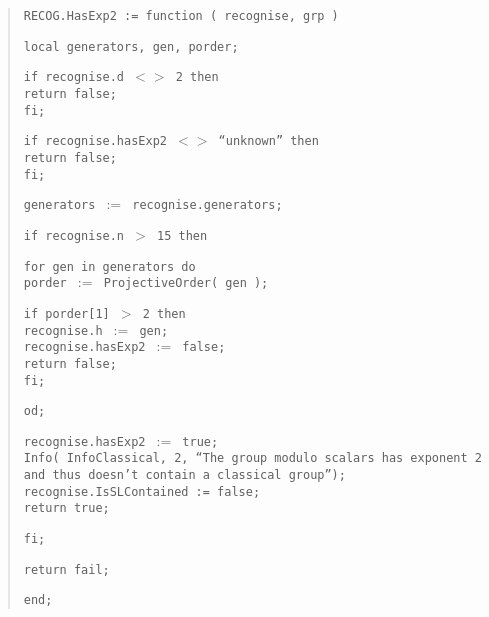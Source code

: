 \documentclass[a4paper,11pt]{article}
\theoremstyle{bla}
\begin{document}
\begin{quote}
\hspace*{-0.3cm} \texttt{RECOG.HasExp2 := function ( recognise, grp )}

  \texttt{local generators, gen, porder;}

  \texttt{if recognise.d $<>$ 2 then}\\
    \hspace*{0.3cm} \texttt{return false;}\\
  \texttt{fi;}

  \texttt{if recognise.hasExp2 $<>$ ``unknown'' then}\\
    \hspace*{0.3cm} \texttt{return false;}\\
  \texttt{fi;}

  \texttt{generators $:=$ recognise.generators;}

  \texttt{if recognise.n $>$ 15 then}

    \hspace*{0.3cm} \texttt{for gen in generators do}\\
      \hspace*{0.6cm} \texttt{porder $:=$ ProjectiveOrder( gen );}

      \hspace*{0.6cm} \texttt{if porder[1] $>$ 2 then}\\
        \hspace*{0.9cm} \texttt{recognise.h $:=$ gen;}\\
        \hspace*{0.9cm} \texttt{recognise.hasExp2 $:=$ false;}\\
        \hspace*{0.9cm} \texttt{return false;}\\
      \hspace*{0.6cm} \texttt{fi;}

    \hspace*{0.3cm} \texttt{od;}

    \hspace*{0.3cm} \texttt{recognise.hasExp2 $:=$ true;}\\
    \hspace*{0.3cm} \texttt{Info( InfoClassical, 2, ``The group modulo scalars has exponent 2}\\
    \hspace*{0.3cm} \texttt{and thus doesn't contain a classical group'');}\\
    \hspace*{0.3cm} \texttt{recognise.IsSLContained := false;}\\
    \hspace*{0.3cm} \texttt{return true;}

  \texttt{fi;}

  \texttt{return fail;}

\hspace*{-0.3cm} \texttt{end;}
\end{quote}
\end{document}
